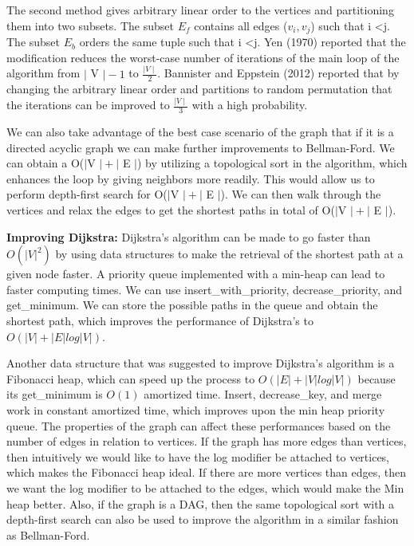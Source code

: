 \documentclass{article}
\begin{document}
The second method gives arbitrary linear order to the vertices and partitioning them into two subsets.  The subset $E_f$ contains all edges ($v_i , v_j$)  such that i \textless j.  The subset $E_b$ orders the same tuple such that i \textless j.  Yen (1970) reported that the modification reduces the worst-case number of iterations of the main loop of the algorithm from $\mid$ V $\mid - 1$ to $\frac{\mid V \mid}{2}$.  Bannister and Eppstein (2012)  reported that by changing the arbitrary linear order and partitions to random permutation that the iterations can be improved to $\frac{\mid V \mid}{3}$ with a high probability.


We can also take advantage of the best case scenario of the graph that if it is a directed acyclic graph we can make further improvements to Bellman-Ford.  We can obtain a O($\mid$V $\mid + \mid$ E $\mid$) by utilizing a topological sort in the algorithm, which enhances the loop by giving neighbors more readily.  This would allow us to perform depth-first search for O($\mid$V $\mid + \mid$ E $\mid$).  We can then walk through the vertices and relax the edges to get the shortest paths in total of O($\mid$V $\mid + \mid$ E $\mid$).

\textbf{Improving Dijkstra:}
	Dijkstra's algorithm can be made to go faster than $O(|V|^2)$ by using data structures to make the retrieval of the shortest path at a given node faster. A priority queue implemented with a min-heap can lead to faster computing times. We can use insert\_with\_priority, decrease\_priority, and get\_minimum. We can store the possible paths in the queue and obtain the shortest path, which improves the performance of Dijkstra's to $O(|V|+|E|log |V|)$. 
	
	
Another data structure that was suggested to improve Dijkstra's algorithm is a Fibonacci heap, which can speed up the process to $O(|E| + |V| log |V|)$ because its get\_minimum is $O(1)$ amortized time. Insert, decrease\_key, and merge work in constant amortized time, which improves upon the min heap priority queue. The properties of the graph can affect these performances based on the number of edges in relation to vertices. If the graph has more edges than vertices, then intuitively we would like to have the log modifier be attached to vertices, which makes the Fibonacci heap ideal. If there are more vertices than edges, then we want the log modifier to be attached to the edges, which would make the Min heap better. Also, if the graph is a DAG, then the same topological sort with a depth-first search can also be used to improve the algorithm in a similar fashion as Bellman-Ford. 
\end{document}
